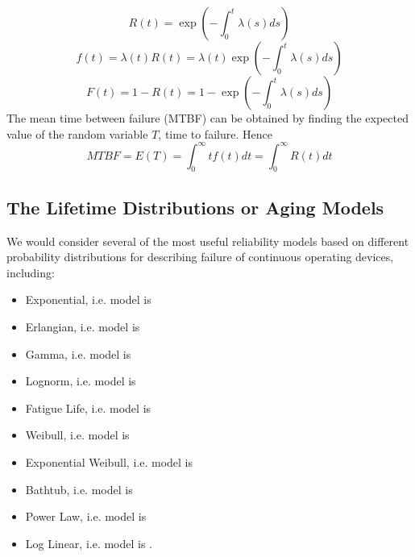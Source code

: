 \begin{equation}
  R(t) = \exp(-\int_{0}^{t} \lambda (s)ds)
\end{equation}
\begin{equation}
	f(t) = \lambda (t)R(t) = \lambda (t)\exp(-\int_{0}^{t} \lambda (s)ds)
\end{equation}
\begin{equation}
 	F(t) = 1 - R(t) = 1 - \exp(-\int_{0}^{t} \lambda (s)ds)
\end{equation}
The mean time between failure (MTBF) can be obtained by finding the expected value of the random variable
$T$, time to failure. Hence
\begin{equation}
  MTBF = E(T) = \int_{0}^{\infty} tf(t)dt = \int_{0}^{\infty} R(t)dt
\end{equation}

\subsection{The Lifetime Distributions or Aging Models}
We would consider several of the most useful reliability models based on different probability
distributions for describing failure of continuous operating devices, including:
\begin{itemize}
	\item Exponential, i.e. model  is 
	\item Erlangian, i.e. model  is 
	\item Gamma, i.e. model  is 
	\item Lognorm, i.e. model  is 
	\item Fatigue Life, i.e. model  is 
	\item Weibull, i.e. model  is 
	\item Exponential Weibull, i.e. model  is 
	\item Bathtub, i.e. model  is 
	\item Power Law, i.e. model  is 
	\item Log Linear, i.e. model  is .
\end{itemize}

